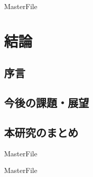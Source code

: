 \expandafter\ifx\csname MasterFile\endcsname\relax
\def\SubFile{hoge}


\setcounter{chapter}{5}
\fi
\cleardoublepage
\chapter{結論}

\label{con:chapter}

\section{序言}
\label{con:introduction}


\section{今後の課題・展望}
\label{con:future_work}


\section{本研究のまとめ}
\label{con:conclusion}

 \expandafter\ifx\csname MasterFile\endcsname\relax
	\def\BibFile{hoge}
	
  \fi
  \expandafter\ifx\csname MasterFile\endcsname\relax

\fi
